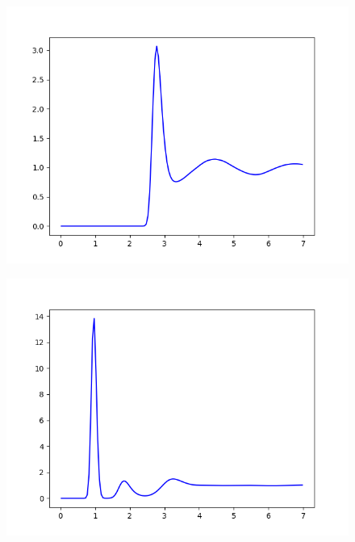 \documentclass[12pt,reqno]{amsart}
\numberwithin{equation}{section}
\begin{document}
\begin{enumerate}
\begin{figure}[H]
\centering
\includegraphics[scale=0.6]{0_0-32bead-bonded-tip4pF-bin05.png}
\end{figure}

\begin{figure}[H]
\centering
\includegraphics[scale=0.6]{0_1-32bead-bonded-tip4pF-bin05.png}
\end{figure}


\end{enumerate}
\end{document}
